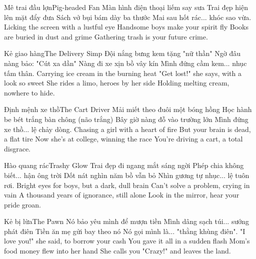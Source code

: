 \begin{tutuyetbox}{Mê trai đầu lợn}{Pig-headed Fan}
Màn hình điện thoại liếm say sưa
Trai đẹp hiện lên mặt đẩy đưa
Sách vở bụi bám dày ba thước
Mai sau hốt rác... khóc sao vừa.
\tcblower
Licking the screen with a lustful eye
Handsome boys make your spirit fly
Books are buried in dust and grime
Gathering trash is your future crime.
\end{tutuyetbox}

\begin{tutuyetbox}{Kẻ giao hàng}{The Delivery Simp}
Đội nắng bưng kem tặng "nữ thần"
Ngờ đâu nàng bảo: "Cút xa dần"
Nàng đi xe xịn bồ vây kín
Mình đứng cầm kem... nhục tấm thân.
\tcblower
Carrying ice cream in the burning heat
"Get lost!" she says, with a look so sweet
She rides a limo, heroes by her side
Holding melting cream, nowhere to hide.
\end{tutuyetbox}

\begin{tutuyetbox}{Định mệnh xe thồ}{The Cart Driver}
Mải miết theo đuôi một bóng hồng
Học hành be bét trắng bàn chông (não trắng)
Bây giờ nàng đỗ vào trường lớn
Mình đứng xe thồ... lệ chảy dòng.
\tcblower
Chasing a girl with a heart of fire
But your brain is dead, a flat tire
Now she's at college, winning the race
You're driving a cart, a total disgrace.
\end{tutuyetbox}

\begin{tutuyetbox}{Hào quang rác}{Trashy Glow}
Trai đẹp đi ngang mắt sáng ngời
Phép chia không biết... hận ông trời
Dốt nát nghìn năm bồ vẫn bỏ
Nhìn gương tự nhục... lệ tuôn rơi.
\tcblower
Bright eyes for boys, but a dark, dull brain
Can't solve a problem, crying in vain
A thousand years of ignorance, still alone
Look in the mirror, hear your pride groan.
\end{tutuyetbox}

\begin{tutuyetbox}{Kẻ bị lừa}{The Pawn}
Nó bảo yêu mình để mượn tiền
Mình dâng sạch túi... sướng phát điên
Tiền ăn mẹ gửi bay theo nó
Nó gọi mình là... "thằng khùng điên".
\tcblower
"I love you!" she said, to borrow your cash
You gave it all in a sudden flash
Mom's food money flew into her hand
She calls you "Crazy!" and leaves the land.
\end{tutuyetbox}

